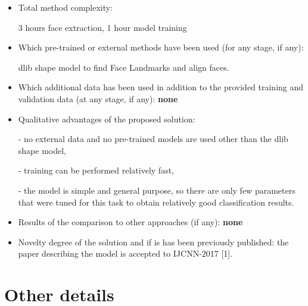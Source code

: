 \documentclass{article}
\begin{document}
\begin{itemize}
\item Total method complexity: 

3 hours face extraction, 1 hour model training

\item Which pre-trained or external methods have been used (for any stage, if any): 

dlib shape model to find Face Landmarks and align faces.

\item Which additional data has been used in addition to the provided training and validation data (at any stage, if any): \textbf{none} 
\item Qualitative advantages of the proposed solution: 

- no external data and no pre-trained models are used other than the dlib shape model, 

- training can be performed relatively fast,

- the model is simple and general purpose, so there are only few parameters that were  tuned for this task to obtain relatively good classification results.

\item Results of the comparison to other approaches (if any): \textbf{none}

\item Novelty degree of the solution and if is has been previously published: the paper describing the model is accepted to IJCNN-2017 [1].
\end{itemize}

\section{Other details}
\end{document}
